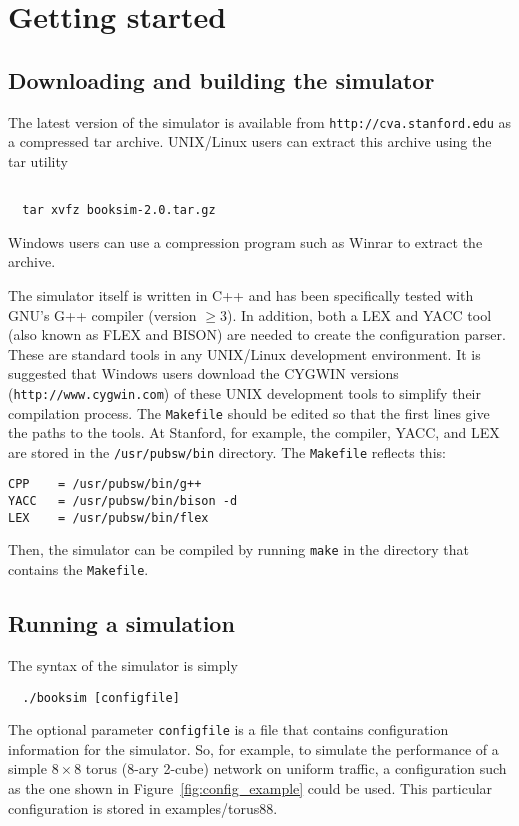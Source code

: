 \documentclass[11pt]{article}
\begin{document}
\section{Getting started}
\label{sec:get_started}

\subsection{Downloading and building the simulator}
\label{sec:download}

The latest version of the simulator is available from
\texttt{http://cva.stanford.edu} as a compressed tar archive.  UNIX/Linux
users can extract this archive using the tar utility
\begin{verbatim}

  tar xvfz booksim-2.0.tar.gz  
\end{verbatim}

Windows users can use a compression program such as Winrar to extract
the archive.

The simulator itself is written in C++ and has been specifically
tested with GNU's G++ compiler (version $\ge3$).  In addition, both a
LEX and YACC tool (also known as FLEX and BISON) are needed to create
the configuration parser.  These are standard tools in any UNIX/Linux
development environment.  It is suggested that Windows users download
the CYGWIN versions (\texttt{http://www.cygwin.com}) of these UNIX
development tools to simplify their compilation process.  The
\texttt{Makefile} should be edited so that the first lines give the
paths to the tools.  At Stanford, for example, the compiler, YACC, and
LEX are stored in the \texttt{/usr/pubsw/bin} directory.  The
\texttt{Makefile} reflects this:
\begin{verbatim}
CPP    = /usr/pubsw/bin/g++
YACC   = /usr/pubsw/bin/bison -d
LEX    = /usr/pubsw/bin/flex
\end{verbatim}
Then, the simulator can be compiled by running \texttt{make} in the
directory that contains the \texttt{Makefile}.

\subsection{Running a simulation}
\label{sec:run_example}

The syntax of the simulator is simply
\begin{verbatim}
  ./booksim [configfile]
\end{verbatim}
The optional parameter \texttt{configfile} is a file that contains
configuration information for the simulator.  So, for example, to
simulate the performance of a simple $8 \times 8$ torus (8-ary 2-cube)
network on uniform traffic, a configuration such as the one shown in
Figure~\ref{fig:config_example} could be used. This particular configuration is stored in examples/torus88.
\end{document}
